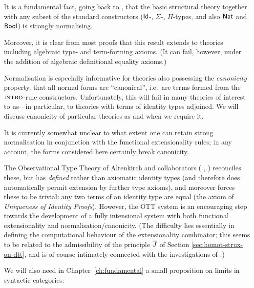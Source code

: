 \begin{para}  It is a fundamental fact, going back to \cite{martin-loef:predicative-part}, that the basic structural theory together with any subset of the standard constructors ($\mathsf{Id}$-, $\Sigma$-, $\Pi$-types, and also $\mathsf{Nat}$ and $\mathsf{Bool}$) is strongly normalising.

Moreover, it is clear from most proofs that this result extends to theories including algebraic type- and term-forming axioms.  (It can fail, however, under the addition of algebraic definitional equality axioms.)

Normalisation is especially informative for theories also possessing the \emph{canonicity} property, that all normal forms are ``canonical'', i.e.\ are terms formed from the $\textsc{intro}$-rule constructors.  Unfortunately, this will fail in many theories of interest to us---in particular, to theories with terms of identity types adjoined.  We will discuss canonicity of particular theories as and when we require it.

It is currently somewhat unclear to what extent one can retain strong normalisation in conjunction with the functional extensionality rules; in any account, the forms considered here certainly break canonicity.

The Observational Type Theory of Altenkirch and collaborators (\cite{altenkirch:ott} , \cite{altenkirch-mcbride-swierstra}) reconciles these, but has \emph{defined} rather than axiomatic identity types (and therefore does automatically permit extension by further type axioms), and moreover forces these to be trivial: any two terms of an identity type are equal (the axiom of \emph{Uniqueness of Identity Proofs}).  However, the OTT system is an encouraging step towards the development of a fully intensional system with both functional extensionality and normalisation/canonicity.  (The difficulty lies essentially in defining the computational behaviour of the extensionality combinator; this seems to be related to the admissibility of the principle $\overline{J}$ of Section \ref{sec:homot-strux-on-dtt}, and is of course intimately connected with the investigations of \cite{garner:on-the-strength}.)
\end{para}

We will also need in Chapter~\ref{ch:fundamental} a small proposition on limits in syntactic categories:

